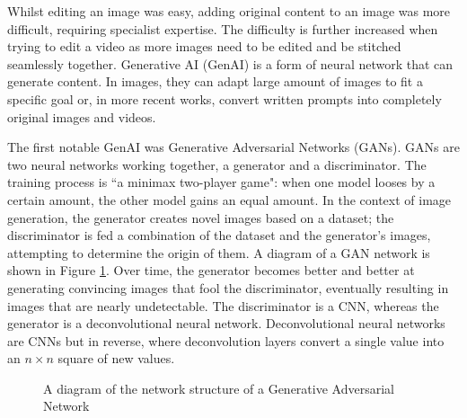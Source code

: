 Whilst editing an image was easy, adding original content to an image was more difficult, requiring specialist expertise. The difficulty is further increased when trying to edit a video as more images need to be edited and be stitched seamlessly together. Generative AI (GenAI) is a form of neural network that can generate content. In images, they can adapt large amount of images to fit a specific goal or, in more recent works, convert written prompts into completely original images and videos.

The first notable GenAI was Generative Adversarial Networks (GANs)\cite{goodfellow2014generative}. GANs are two neural networks working together, a generator and a discriminator. The training process is ``a minimax two-player game": when one model looses by a certain amount, the other model gains an equal amount. In the context of image generation, the generator creates novel images based on a dataset; the discriminator is fed a combination of the dataset and the generator's images, attempting to determine the origin of them. A diagram of a GAN network is shown in Figure \ref{fig:gan-diagram}. Over time, the generator becomes better and better at generating convincing images that fool the discriminator, eventually resulting in images that are nearly undetectable. The discriminator is a CNN, whereas the generator is a deconvolutional neural network\cite{zeiler2011adaptive}. Deconvolutional neural networks are CNNs but in reverse, where deconvolution layers convert a single value into an $n \times n$ square of new values.

\begin{figure}[h]
    \centering
    \caption{A diagram of the network structure of a Generative Adversarial Network}
    \label{fig:gan-diagram}
\end{figure}

